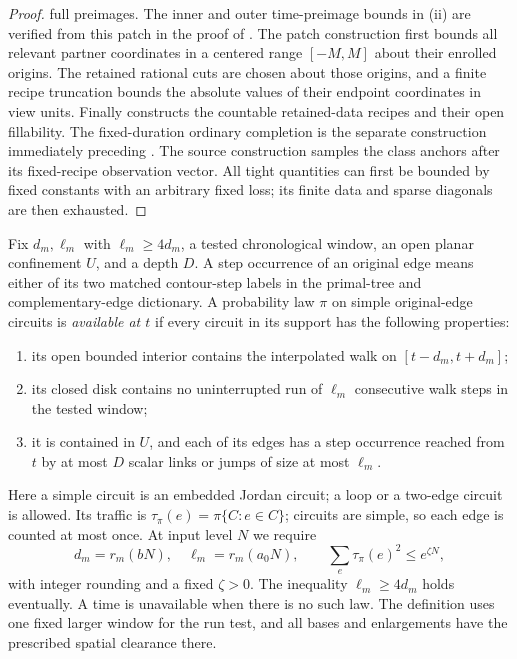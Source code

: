 \begin{proof}
full preimages.  The inner and outer time-preimage bounds in (ii)
are verified from this patch in the proof of
\cite[Proposition~11.30]{P}.
The patch construction first bounds all relevant partner coordinates
in a centered range \([-M,M]\) about their enrolled origins.
The retained rational cuts are chosen about those origins, and a finite
recipe truncation bounds the absolute values of their endpoint coordinates
in view units.
Finally \cite[Lemma~11.27]{P} constructs the countable
retained-data recipes and their open fillability.  The fixed-duration
ordinary completion is the separate construction immediately
preceding \cite[Proposition~11.30]{P}.
The source construction samples the class anchors after its
fixed-recipe observation vector.  All tight quantities can first
be bounded by fixed constants with an arbitrary fixed loss; its
finite data and sparse diagonals are then exhausted.
\end{proof}

Fix \(d_m,\ell_m\) with \(\ell_m\ge4d_m\), a tested chronological
window, an open planar confinement \(U\), and a depth \(D\).
A step occurrence of an original edge means either of its two
matched contour-step labels in the primal-tree and complementary-edge
dictionary.
A probability law \(\pi\) on simple original-edge circuits is
\emph{available at \(t\)} if every circuit in its support has
the following properties:
\begin{enumerate}[label=(\alph*)]
\item its open bounded interior contains the interpolated walk
on \([t-d_m,t+d_m]\);
\item its closed disk contains no uninterrupted run of
\(\ell_m\) consecutive walk steps in the tested window;
\item it is contained in \(U\), and each of its edges has a
step occurrence reached from \(t\) by at most \(D\) scalar links
or jumps of size at most \(\ell_m\).
\end{enumerate}
Here a simple circuit is an embedded Jordan circuit; a loop or
a two-edge circuit is allowed.
Its traffic is
\(\tau_\pi(e)=\pi\{C:e\in C\}\); circuits are simple, so each
edge is counted at most once.  At input level \(N\) we require
\begin{equation}
\label{eq:available-traffic}
 d_m=r_m(bN),\quad \ell_m=r_m(a_0N),\qquad
 \sum_e\tau_\pi(e)^2\le e^{\zeta N},
\end{equation}
with integer rounding and a fixed \(\zeta>0\).  The inequality
\(\ell_m\ge4d_m\) holds eventually.  A time is unavailable when
there is no such law.  The definition uses one fixed larger
window for the run test, and all bases and enlargements have
the prescribed spatial clearance there.

